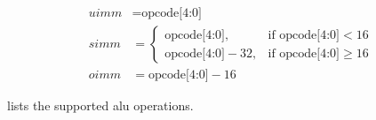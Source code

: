 \begin{align*}
  uimm &= \text{opcode[4:0]}                                     \\
  simm &= \begin{cases}
            \text{opcode[4:0]},      &\text{if opcode[4:0]} < 16 \\
            \text{opcode[4:0]} - 32, &\text{if opcode[4:0]} \ge 16
          \end{cases}                                            \\
  oimm &= \text{opcode[4:0]} - 16
\end{align*}

 lists the supported \gls{alu} operations.

\begingroup
\setlength{\LTleft}{-20cm plus -1fill}
\setlength{\LTright}{\LTleft}
